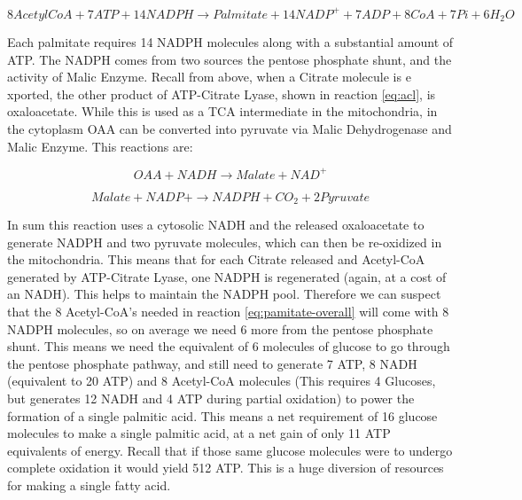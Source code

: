 \documentclass{tufte-handout}
\begin{document}
\begin{equation}\label{eq:pamitate-overall}
8 AcetylCoA + 7 ATP + 14 NADPH \rightarrow Palmitate + 14 NADP^+ + 7 ADP + 8 CoA  + 7 Pi + 6H_2O
\end{equation}

  Each palmitate requires 14 NADPH molecules along with a substantial amount of ATP.  The NADPH comes from two sources the pentose phosphate shunt, and the activity of Malic Enzyme.  Recall from above, when a Citrate molecule is e xported, the other product of ATP-Citrate Lyase, shown in reaction \ref{eq:acl}, is oxaloacetate.  While this is used as a TCA intermediate in the mitochondria, in the cytoplasm OAA can be converted into pyruvate via Malic Dehydrogenase and Malic Enzyme.  This reactions are:

\begin{equation}\label{eq:me}
OAA + NADH  \rightarrow Malate + NAD^+
\end{equation}

\begin{equation}\label{eq:mdh}
Malate + NADP+  \rightarrow NADPH + CO_2 + 2 Pyruvate
\end{equation}

In sum this reaction uses a cytosolic NADH and the released oxaloacetate to generate NADPH and two pyruvate molecules, which can then be re-oxidized in the mitochondria.  This means that for each Citrate released and Acetyl-CoA generated by ATP-Citrate Lyase, one NADPH is regenerated (again, at a cost of an NADH).  This helps to maintain the NADPH pool.  Therefore we can suspect that the 8 Acetyl-CoA's needed in reaction \ref{eq:pamitate-overall} will come with 8 NADPH molecules, so on average we need 6 more from the pentose phosphate shunt.  This means we need the equivalent of 6 molecules of glucose to go through the pentose phosphate pathway, and still need to generate 7 ATP, 8 NADH (equivalent to 20 ATP) and 8 Acetyl-CoA molecules (This requires  4 Glucoses, but generates 12 NADH and 4 ATP during partial oxidation) to power the formation of a single palmitic acid.  This means a net requirement of 16 glucose molecules to make a single palmitic acid, at a net gain of only 11 ATP equivalents of energy.  Recall that if those same glucose molecules were to undergo complete oxidation it would yield 512 ATP.  This is a huge diversion of resources for making a single fatty acid.
\end{document}
